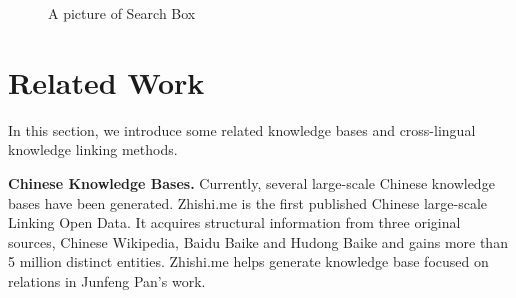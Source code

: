 \documentclass[runningheads,a4paper]{llncs}
\newcommand{\para}[1]{\vspace{0.1cm}\noindent\textbf{#1}}
\begin{document}
\begin{CJK*}{UTF8}{song}
\begin{figure}
\centering
{}
\hspace{0.01cm}
\caption{A picture of Search Box}
\label{fig:access}
\end{figure}

\section{Related Work}
\label{sec:work}
In this section, we introduce some related knowledge bases and cross-lingual knowledge linking methods.

\para{Chinese Knowledge Bases.} Currently, several large-scale Chinese knowledge bases have been generated. Zhishi.me\cite{niu2011zhishi,wang2014publishing} is the first published Chinese large-scale Linking Open Data. It acquires structural information from three original sources, Chinese Wikipedia, Baidu Baike and Hudong Baike and gains more than 5 million distinct entities. Zhishi.me helps generate knowledge base focused on relations in Junfeng Pan’s work\cite{pan2012building}.


\end{CJK*}
\end{document}
